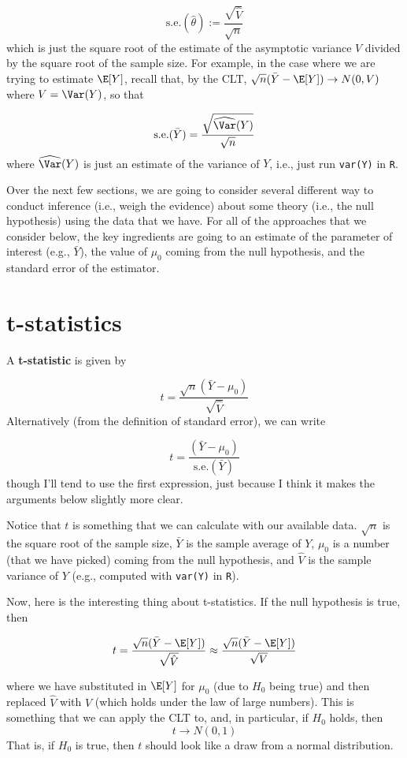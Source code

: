 \documentclass[
  letterpaper,
  DIV=11,
  numbers=noendperiod]{scrreprt}
\begin{document}
\[
  \textrm{s.e.}(\hat{\theta}) := \frac{\sqrt{\hat{V}}}{\sqrt{n}}
\] which is just the square root of the estimate of the asymptotic
variance \(V\) divided by the square root of the sample size. For
example, in the case where we are trying to estimate \(\E[Y]\), recall
that, by the CLT, \(\sqrt{n}(\bar{Y} - \E[Y]) \rightarrow N(0,V)\) where
\(V=\Var(Y)\), so that

\[
  \textrm{s.e.}(\bar{Y}) = \frac{\sqrt{\widehat{\Var}(Y)}}{\sqrt{n}}
\] where \(\widehat{\Var}(Y)\) is just an estimate of the variance of
\(Y\), i.e., just run \texttt{var(Y)} in \texttt{R}.

Over the next few sections, we are going to consider several different
way to conduct inference (i.e., weigh the evidence) about some theory
(i.e., the null hypothesis) using the data that we have. For all of the
approaches that we consider below, the key ingredients are going to an
estimate of the parameter of interest (e.g., \(\bar{Y}\)), the value of
\(\mu_0\) coming from the null hypothesis, and the standard error of the
estimator.

\section{t-statistics}\label{t-statistics}

A \textbf{t-statistic} is given by

\[
  t = \frac{\sqrt{n} (\bar{Y} - \mu_0)}{\sqrt{\hat{V}}}
\] Alternatively (from the definition of standard error), we can write

\[
  t = \frac{(\bar{Y} - \mu_0)}{\textrm{s.e.}(\bar{Y})}
\] though I'll tend to use the first expression, just because I think it
makes the arguments below slightly more clear.

Notice that \(t\) is something that we can calculate with our available
data. \(\sqrt{n}\) is the square root of the sample size, \(\bar{Y}\) is
the sample average of \(Y\), \(\mu_0\) is a number (that we have picked)
coming from the null hypothesis, and \(\hat{V}\) is the sample variance
of \(Y\) (e.g., computed with \texttt{var(Y)} in \texttt{R}).

Now, here is the interesting thing about t-statistics. If the null
hypothesis is true, then

\[
  t = \frac{\sqrt{n} (\bar{Y} - \E[Y])}{\sqrt{\hat{V}}} \approx \frac{\sqrt{n} (\bar{Y} - \E[Y])}{\sqrt{V}}
\]

where we have substituted in \(\E[Y]\) for \(\mu_0\) (due to \(H_0\)
being true) and then replaced \(\hat{V}\) with \(V\) (which holds under
the law of large numbers). This is something that we can apply the CLT
to, and, in particular, if \(H_0\) holds, then \[
  t \rightarrow N(0,1)
\] That is, if \(H_0\) is true, then \(t\) should look like a draw from
a normal distribution.
\end{document}
